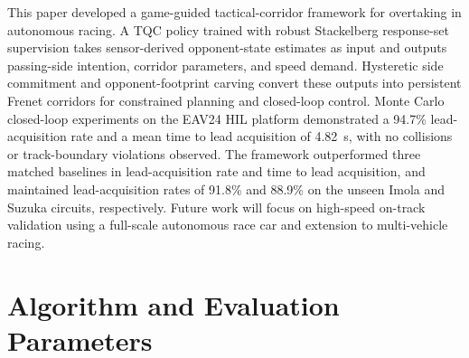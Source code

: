 \documentclass[sensors,article,submit,moreauthors]{Definitions/mdpi}
\begin{document}


This paper developed a game-guided tactical-corridor framework for overtaking in autonomous racing. A TQC policy trained with robust Stackelberg response-set supervision takes sensor-derived opponent-state estimates as input and outputs passing-side intention, corridor parameters, and speed demand. Hysteretic side commitment and opponent-footprint carving convert these outputs into persistent Frenet corridors for constrained planning and closed-loop control.
Monte Carlo closed-loop experiments on the EAV24 HIL platform demonstrated a 94.7\% lead-acquisition rate and a mean time to lead acquisition of 4.82~s, with no collisions or track-boundary violations observed. The framework outperformed three matched baselines in lead-acquisition rate and time to lead acquisition, and maintained lead-acquisition rates of 91.8\% and 88.9\% on the unseen Imola and Suzuka circuits, respectively.
Future work will focus on high-speed on-track validation using a full-scale autonomous race car and extension to multi-vehicle racing.


\FloatBarrier
{}
\appendixstart
\appendix
\section{Algorithm and Evaluation Parameters}
\label{app:parameters}
\setcounter{table}{0}
\setcounter{equation}{0}
\renewcommand{\thetable}{A\arabic{table}}
\renewcommand{\theequation}{A\arabic{equation}}
\end{document}
